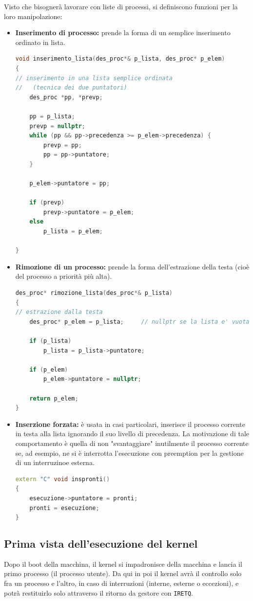 \documentclass[a4paper,11pt]{article}
\begin{document}
Visto che bisognerà lavorare con liste di processi, si definiscono funzioni per la loro manipolazione:
\begin{itemize}
	\item \textbf{Inserimento di processo:} prende la forma di un semplice inserimento ordinato in lista.
\begin{lstlisting}[language=C++, style=codestyle]	
void inserimento_lista(des_proc*& p_lista, des_proc* p_elem)
{
// inserimento in una lista semplice ordinata
//   (tecnica dei due puntatori)
	des_proc *pp, *prevp;

	pp = p_lista;
	prevp = nullptr;
	while (pp && pp->precedenza >= p_elem->precedenza) {
		prevp = pp;
		pp = pp->puntatore;
	}

	p_elem->puntatore = pp;

	if (prevp)
		prevp->puntatore = p_elem;
	else
		p_lista = p_elem;

}
\end{lstlisting}
	\item \textbf{Rimozione di un processo:} prende la forma dell'estrazione della testa (cioè del processo a priorità più alta).
\begin{lstlisting}[language=C++, style=codestyle]	
des_proc* rimozione_lista(des_proc*& p_lista)
{
// estrazione dalla testa
	des_proc* p_elem = p_lista;  	// nullptr se la lista e' vuota

	if (p_lista)
		p_lista = p_lista->puntatore;

	if (p_elem)
		p_elem->puntatore = nullptr;

	return p_elem;
}
\end{lstlisting}
\item \textbf{Inserzione forzata:} è usata in casi particolari, inserisce il processo corrente in testa alla lista ignorando il suo livello di precedenza.
	La motivazione di tale comportamento è quella di non "svantaggiare" inutilmente il processo corrente se, ad esempio, ne si è interrotta l'esecuzione con preemption per la gestione di un interruzinoe esterna.
\begin{lstlisting}[language=C++, style=codestyle]	
extern "C" void inspronti()
{
	esecuzione->puntatore = pronti;
	pronti = esecuzione;
}
\end{lstlisting}
\end{itemize}

\subsection{Prima vista dell'esecuzione del kernel}
Dopo il boot della macchina, il kernel si impadronisce della macchina e lancia il primo processo (il processo utente).
Da qui in poi il kernel avrà il controllo solo fra un processo e l'altro, in caso di interruzioni (interne, esterne o eccezioni), e potrà restituirlo solo attraverso il ritorno da gestore con \lstinline|IRETQ|.
\end{document}
